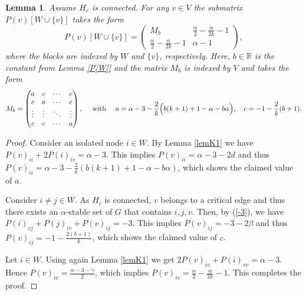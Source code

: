 \documentclass[11pt]{article}
\newtheorem{lemma}[theorem]{Lemma}
\numberwithin{equation}{section}
\begin{document}
\begin{lemma}\label{P_v}
Assume $H_c$ is connected. For any $v\in V$  the submatrix $P(v)[W\cup\{v\}]$ takes the form
\begin{equation}\label{matrix_P_v}
        P(v)[W\cup\{v\}]=
\left(
\begin{array}{c|c}
M_b & \frac{\alpha}{2}-\frac{\alpha}{2k}-1 \\
\hline
\frac{\alpha}{2}-\frac{\alpha}{2k}-1 & \alpha-1
\end{array}
\right),
\end{equation}
where the blocks are indexed by $W$ and $\{v\}$, respectively.
Here,  $b\in \mathbb{R}$ is the constant from  Lemma \ref{P[W]} and the matrix $M_b$ is indexed by $V$ and takes the form
\begin{equation}\label{eqMb}
M_b=\begin{pmatrix}
 a & c &\cdots & c \\
c & a& \cdots & c \\
\vdots  & \vdots  & \ddots & \vdots  \\
c & c & \cdots & a 
\end{pmatrix},
\quad \text{ with }  \quad a= \alpha -3 - {2\over k}\Big(b(k+1)+1-\alpha -b\alpha\Big),\quad  c=-1-\frac{2}{k}(b+1).
\end{equation}
\end{lemma}

\begin{proof}
Consider an isolated node $i\in W$. By Lemma \ref{lemK1} we have  $P(v)_{ii}+2P(i)_{iv}=\alpha-3$. This implies 
$P(v)_{ii}=\alpha-3-2d$ and thus $P(v)_{ii} =\alpha-3-\frac{2}{k}(b(k+1)+1-\alpha-b\alpha)$, which shows the claimed value of $a$. %

Consider $i\ne j\in W$. As $H_c$ is connected, $v$ belongs to a critical edge and thus  there exists an $\alpha$-stable set of $G$ that contains $i,j,v$. Then,  by  (\ref{-3}), we have 
 $P(i)_{vj}+P(j)_{iv}+P(v)_{ij}=-3$. This implies  $P(v)_{ij} =-3-2\beta$ and thus  $P(v)_{ij}=-1-\frac{2(b+1)}{k}$, which shows the claimed value of $c$. %

Let $i\in W$. Using again  Lemma \ref{lemK1} we get $2P(v)_{iv}+P(i)_{vv}=\alpha-3$. Hence $P(v)_{iv}=\frac{\alpha-3-\gamma}{2}$, which implies   $P(v)_{iv}=\frac{\alpha}{2}-\frac{\alpha}{2k}-1$. This completes the proof.
\end{proof}
\end{document}

